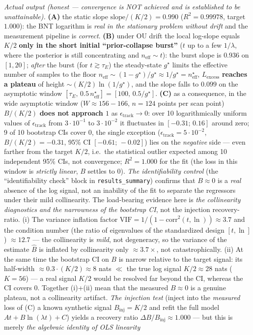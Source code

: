 \documentclass[12pt]{iopart}
\begin{document}
\emph{Actual output (honest --- convergence is NOT achieved and is established to be unattainable).} \textbf{(A)} the static slope \(\mathrm{slope}/(K/2) = 0.990\) (\(R^2 = 0.99978\), target \(1.000\)): the BNT logarithm is \emph{real in the stationary problem without drift} and the measurement pipeline is \emph{correct}. \textbf{(B)} under OU drift the local log-slope equals \(K/2\) \textbf{only in the short initial ``prior-collapse burst''} (\(t\) up to a few \(1/\lambda\), where the posterior is still concentrating and \(n_{\text{eff}} \sim t\)): the burst slope is \(0.936\) on \([1,20]\); \emph{after} the burst (for \(t \gtrsim \tau_E\)) the steady-state \(g^\star\) limits the effective number of samples to the floor \(n_{\text{eff}} \sim (1-g^\star)/g^\star \approx 1/g^\star = n_{\text{eff}}^\star\), \(L_{\text{excess}}\) \textbf{reaches a plateau} of height \(\sim (K/2)\ln(1/g^\star)\), and the slope falls to \(0.099\) on the asymptotic window \([\tau_E,\,0.5\,n_{\text{eff}}^\star] = [100,\,0.5/g^\star]\). \textbf{(C)} as a consequence, in the wide asymptotic window (\(W \approx 156{-}166\), \(n = 124\) points per scan point) \(B/(K/2)\) \textbf{does not approach \(1\)} as \(\epsilon_{\text{track}} \to 0\): over 10 logarithmically uniform values of \(\epsilon_{\text{track}}\) from \(3\cdot10^{-1}\) to \(3\cdot10^{-2}\) it fluctuates in \([-0.31;\,0.16]\) around zero; 9 of 10 bootstrap CIs cover \(0\), the single exception (\(\epsilon_{\text{track}} = 5\cdot10^{-2}\), \(B/(K/2) = -0.31\), 95\% CI \([-0.61;\,-0.02]\)) lies on the \emph{negative} side --- even farther from the target \(K/2\), i.e.~the statistical outlier expected among 10 independent 95\% CIs, not convergence; \(R^2 = 1.000\) for the fit (the loss in this window is \emph{strictly linear}, \(B\) settles to \(0\)). \emph{The identifiability control} (the ``identifiability check'' block in \texttt{results\_summary}) confirms that \(B \approx 0\) is a \emph{real} absence of the log signal, not an inability of the fit to separate the regressors under their mild collinearity. The load-bearing evidence here is \emph{the collinearity diagnostics and the narrowness of the bootstrap CI}, not the injection recovery-ratio. (i) The variance inflation factor \(\mathrm{VIF} = 1/(1-\mathrm{corr}^2(t,\ln)) \approx 3.7\) and the condition number (the ratio of eigenvalues of the standardized design \([t,\ln]\)) \(\approx 12.7\) --- the collinearity is \emph{mild}, not degeneracy, so the variance of the estimate \(\hat B\) is inflated by collinearity only \(\approx 3.7\times\), not catastrophically. (ii) At the same time the bootstrap CI on \(B\) is narrow relative to the target signal: its half-width \(\approx 0.3\cdot(K/2) \approx 8\) nats \(\ll\) the true log signal \(K/2 \approx 28\) nats (\(K = 56\)) --- a real signal \(K/2\) would be resolved far beyond the CI, whereas the CI covers \(0\). Together (i)+(ii) mean that the measured \(B \approx 0\) is a genuine plateau, not a collinearity artifact. \emph{The injection test} (inject into the \emph{measured} loss of (C) a known synthetic signal \(B_{\text{inj}} = K/2\) and refit the full model \(A t + B\ln(\lambda t) + C\)) yields a recovery ratio \(\Delta B/B_{\text{inj}} \approx 1.000\) --- but this is merely \emph{the algebraic identity of OLS linearity} 
\end{document}
